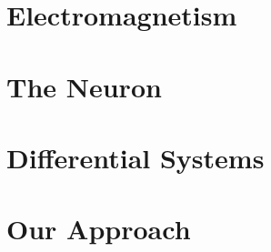 
\chapter{Electromagnetism}


\chapter{The Neuron}


\chapter{Differential Systems}


\chapter{Our Approach}
